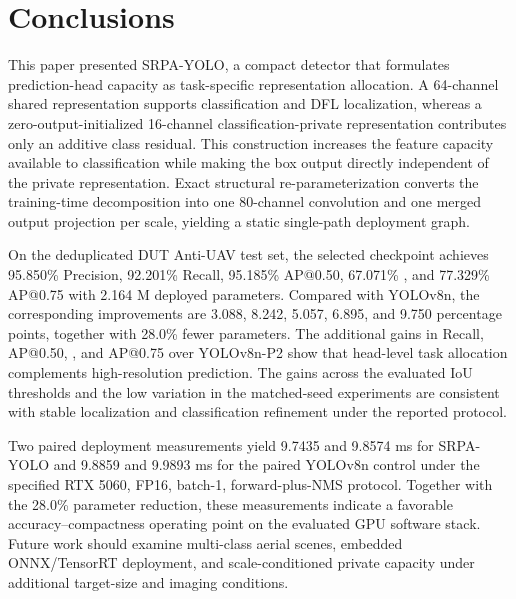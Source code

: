 \section{Conclusions}

This paper presented SRPA-YOLO, a compact detector that formulates prediction-head capacity as task-specific representation allocation. A 64-channel shared representation supports classification and DFL localization, whereas a zero-output-initialized 16-channel classification-private representation contributes only an additive class residual. This construction increases the feature capacity available to classification while making the box output directly independent of the private representation. Exact structural re-parameterization converts the training-time decomposition into one 80-channel convolution and one merged output projection per scale, yielding a static single-path deployment graph.

On the deduplicated DUT Anti-UAV test set, the selected checkpoint achieves 95.850\% Precision, 92.201\% Recall, 95.185\% AP@0.50, 67.071\% \mapall{}, and 77.329\% AP@0.75 with 2.164 M deployed parameters. Compared with YOLOv8n, the corresponding improvements are 3.088, 8.242, 5.057, 6.895, and 9.750 percentage points, together with 28.0\% fewer parameters. The additional gains in Recall, AP@0.50, \mapall{}, and AP@0.75 over YOLOv8n-P2 show that head-level task allocation complements high-resolution prediction. The gains across the evaluated IoU thresholds and the low variation in the matched-seed experiments are consistent with stable localization and classification refinement under the reported protocol.

Two paired deployment measurements yield 9.7435 and 9.8574 ms for SRPA-YOLO and 9.8859 and 9.9893 ms for the paired YOLOv8n control under the specified RTX 5060, FP16, batch-1, forward-plus-NMS protocol. Together with the 28.0\% parameter reduction, these measurements indicate a favorable accuracy--compactness operating point on the evaluated GPU software stack. Future work should examine multi-class aerial scenes, embedded ONNX/TensorRT deployment, and scale-conditioned private capacity under additional target-size and imaging conditions.
